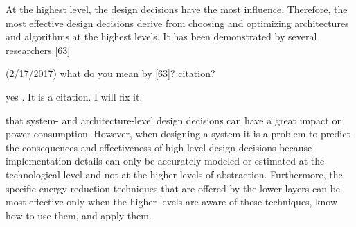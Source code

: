 At the highest level, the design decisions have the most influence.
Therefore, the most effective design decisions derive from choosing
and optimizing architectures and algorithms at the highest levels. It
has been demonstrated by several researchers [63]
\begin{cmtPai}
	(2/17/2017) what do you mean by [63]? citation?
\end{cmtPai}
\begin{cmtSMS}
	yes . It is a citation. I will fix it.
\end{cmtSMS}
that system- and architecture-level design decisions can have a great
impact on power consumption. However, when designing a system it is a
problem to predict the consequences and effectiveness of high-level
design decisions because implementation details can only be
accurately modeled or estimated at the technological level and not at
the higher levels of abstraction. Furthermore, the specific energy
reduction techniques that are offered by the lower layers can be most
effective only when the higher levels are aware of these techniques,
know how to use them, and apply them.
 
